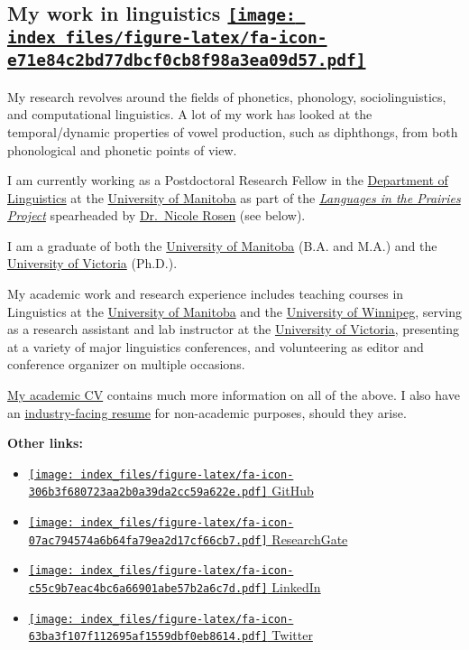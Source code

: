 \documentclass[
]{article}
\providecommand{\tightlist}{%
  \setlength{\itemsep}{0pt}\setlength{\parskip}{0pt}}
\begin{document}
\hypertarget{work}{%
\subsection[My work in linguistics ]{\texorpdfstring{My work in
linguistics
\href{pdf/OnossonCV.pdf}{\protect\texttt{[image: index\_files/figure-latex/fa-icon-e71e84c2bd77dbcf0cb8f98a3ea09d57.pdf]}}}{My work in linguistics }}\label{work}}

My research revolves around the fields of phonetics, phonology,
sociolinguistics, and computational linguistics. A lot of my work has
looked at the temporal/dynamic properties of vowel production, such as
diphthongs, from both phonological and phonetic points of view.

I am currently working as a Postdoctoral Research Fellow in the
\href{https://umanitoba.ca/linguistics/}{Department of Linguistics} at
the \href{https://www.umanitoba.ca/}{University of Manitoba} as part of
the
\href{https://home.cc.umanitoba.ca/~rosenn/sace.html}{\emph{Languages in
the Prairies Project}} spearheaded by
\href{https://home.cc.umanitoba.ca/~rosenn/}{Dr.~Nicole Rosen} (see
below).

I am a graduate of both the
\href{http://www.umanitoba.ca/linguistics/}{University of Manitoba}
(B.A. and M.A.) and the
\href{https://www.uvic.ca/humanities/linguistics/}{University of
Victoria} (Ph.D.).

My academic work and research experience includes teaching courses in
Linguistics at the
\href{http://www.umanitoba.ca/linguistics/}{University of Manitoba} and
the
\href{https://www.uwinnipeg.ca/interdisciplinary-linguistics/index.html}{University
of Winnipeg}, serving as a research assistant and lab instructor at the
\href{https://www.uvic.ca/humanities/linguistics/}{University of
Victoria}, presenting at a variety of major linguistics conferences, and
volunteering as editor and conference organizer on multiple occasions.

\href{pdf/OnossonCV.pdf}{My academic CV} contains much more information
on all of the above. I also have an
\href{pdf/OnossonResume.pdf}{industry-facing resume} for non-academic
purposes, should they arise.

\textbf{Other links:}

\begin{itemize}
\tightlist
\item
  \href{https://github.com/onosson}{\texttt{[image: index\_files/figure-latex/fa-icon-306b3f680723aa2b0a39da2cc59a622e.pdf]}
  GitHub}
\item
  \href{https://www.researchgate.net/profile/Sky_Onosson}{\texttt{[image: index\_files/figure-latex/fa-icon-07ac794574a6b64fa79ea2d17cf66cb7.pdf]}
  ResearchGate}
\item
  \href{https://www.linkedin.com/in/sky-onosson-57902870/}{\texttt{[image: index\_files/figure-latex/fa-icon-c55c9b7eac4bc6a66901abe57b2a6c7d.pdf]}
  LinkedIn}
\item
  \href{https://twitter.com/onosson}{\texttt{[image: index\_files/figure-latex/fa-icon-63ba3f107f112695af1559dbf0eb8614.pdf]}
  Twitter}
\end{itemize}
\end{document}
